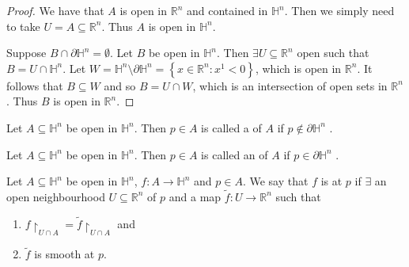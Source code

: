 \documentclass[notoc,notitlepage]{tufte-book}
\begin{document}
\begin{proof}
  We have that $A$ is open in $\mathbb{R}^n$ and contained in $\mathbb{H}^n$.
  Then we simply need to take $U = A \subseteq \mathbb{R}^n$. Thus $A$ is open
  in $\mathbb{H}^n$.

  Suppose $B \cap \partial \mathbb{H}^n = \emptyset$. Let $B$ be open in
  $\mathbb{H}^n$. Then $\exists U \subseteq \mathbb{R}^n$ open such that $B = U
  \cap \mathbb{H}^n$. Let $W = \mathbb{H}^n \setminus \partial \mathbb{H}^n =
  \left\{ x \in \mathbb{R}^n : x^1 < 0 \right\}$,
  which is open in $\mathbb{R}^n$. It follows that $B \subseteq W$ and so $B = U
  \cap W$, which is an intersection of open sets in $\mathbb{R}^n$. Thus $B$ is
  open in $\mathbb{R}^n$.
\end{proof}

\begin{defn}\label{defn:interior_point_in_the_half_space}
  Let $A \subseteq \mathbb{H}^n$ be open in $\mathbb{H}^n$. Then $p \in A$ is
  called a  of $A$ if $p \notin \partial \mathbb{H}^n$
  .
\end{defn}

\begin{defn}\label{defn:boundary_point_in_the_half_space}
  Let $A \subseteq \mathbb{H}^n$ be open in $\mathbb{H}^n$. Then $p \in A$ is
  called an  of $A$ if $p \in \partial \mathbb{H}^n$
  .
\end{defn}

\begin{defn}\label{defn:smooth_functions_in_the_half_space}
  Let $A \subseteq \mathbb{H}^n$ be open in $\mathbb{H}^n$, $f : A \to
  \mathbb{H}^n$ and $p \in A$. We say that $f$ is  at $p$ if
  $\exists$ an open neighbourhood $U \subseteq \mathbb{R}^n$ of $p$ and a map
  $\tilde{f} : U \to \mathbb{R}^n$ such that
  \begin{enumerate}
    \item $f \restriction_{U \cap A} = \tilde{f} \restriction_{U \cap A}$ and
    \item $\tilde{f}$ is smooth at $p$.
  \end{enumerate}
\end{defn}
\end{document}
